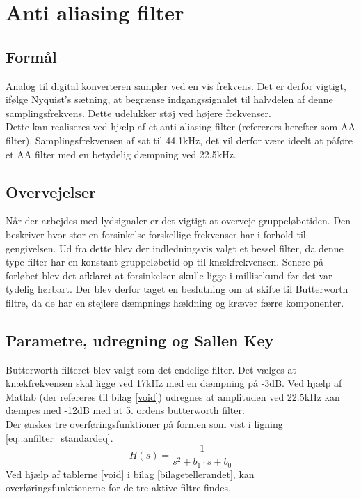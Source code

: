 
\section{Anti aliasing filter}
\subsection{Formål}
Analog til digital konverteren sampler ved en vis frekvens. Det er derfor vigtigt, ifølge Nyquist’s sætning, at begrænse indgangssignalet til halvdelen af denne samplingsfrekvens. Dette udelukker støj ved højere frekvenser.\\

Dette kan realiseres ved hjælp af et anti aliasing filter (refererers herefter som AA filter). Samplingsfrekvensen af sat til 44.1kHz, det vil derfor være ideelt at påføre et AA filter med en betydelig dæmpning ved 22.5kHz.\\
\subsection{Overvejelser}
Når der arbejdes med lydsignaler er det vigtigt at overveje gruppeløbetiden. Den beskriver hvor stor en forsinkelse forskellige frekvenser har i forhold til gengivelsen. Ud fra dette blev der indledningsvis valgt et bessel filter, da denne type filter har en konstant gruppeløbetid op til knækfrekvensen. Senere på forløbet blev det afklaret at forsinkelsen skulle ligge i millisekund før det var tydelig hørbart. Der blev derfor taget en beslutning om at skifte til Butterworth filtre, da de har en stejlere dæmpnings hældning og kræver færre komponenter.
\subsection{Parametre, udregning og Sallen Key}\label{sec::anfilter_sallenpara}
Butterworth filteret blev valgt som det endelige filter. 
Det vælges at knækfrekvensen skal ligge ved 17kHz med en dæmpning på -3dB. Ved hjælp af Matlab (der refereres til bilag \ref{void}) udregnes at amplituden ved 22.5kHz kan dæmpes med -12dB med at 5. ordens butterworth filter.\\
Der ønskes tre overføringsfunktioner på formen som vist i ligning \ref{eq::anfilter_standardeq}.
\begin{equation}
	H(s) = \dfrac{1}{s^2+b_1\cdot s + b_0}\label{eq::anfilter_standardeq}
\end{equation}
Ved hjælp af tablerne \ref{void} i bilag \ref{bilagetellerandet}, kan overføringsfunktionerne for de tre aktive filtre findes.

